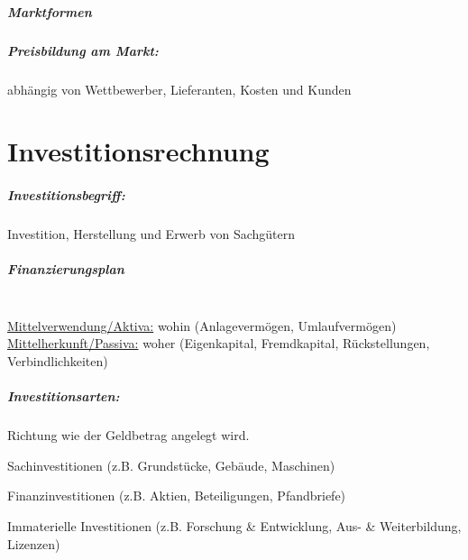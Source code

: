 

\clearpage
\paragraph{Marktformen}

\paragraph{Preisbildung am Markt:} abhängig von Wettbewerber, Lieferanten, Kosten und Kunden


\clearpage
\chapter{Investitionsrechnung}
\paragraph{Investitionsbegriff:} Investition, Herstellung und Erwerb von Sachgütern

\paragraph{Finanzierungsplan}\quad\\
\ul{Mittelverwendung/Aktiva:} wohin (Anlagevermögen, Umlaufvermögen)\\
\ul{Mittelherkunft/Passiva:} woher (Eigenkapital, Fremdkapital, Rückstellungen, Verbindlichkeiten)

\paragraph{Investitionsarten:} Richtung wie der Geldbetrag angelegt wird.

\begin{compactitem}
	\item Sachinvestitionen (z.B. Grundstücke, Gebäude, Maschinen)
	\item Finanzinvestitionen (z.B. Aktien, Beteiligungen, Pfandbriefe)
	\item Immaterielle Investitionen (z.B. Forschung \& Entwicklung, Aus- \& Weiterbildung, Lizenzen)
\end{compactitem}

